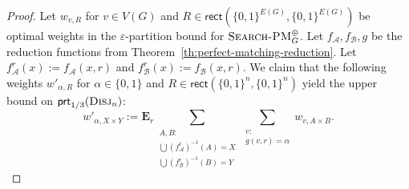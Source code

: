 \documentclass[11pt]{article}
\newcommand{\scterm}[1]{{\textrm{\sc #1}}}
\newcommand{\rect}{\mathsf{rect}}
\newcommand{\rectone}[1]{\rect(#1,#1)}
\newcommand{\prt}{\mathsf{prt}}
\newcommand{\disj}{\scterm{Disj}}
\newcommand{\xorPM}{\textsc{Search-PM}^\oplus}
\newcommand{\Alice}{\mathcal{A}}
\newcommand{\Bob}{\mathcal{B}}
\newcommand{\E}{\mathbf{E}}
\numberwithin{equation}{section}
\begin{document}
\begin{proof}
Let $w_{v,R}$ for $v \in V(G)$ and $R\in \rectone{\{0,1\}^{E(G)}}$ be optimal weights in the $\varepsilon$-partition bound for $\xorPM_G$. Let $f_{\Alice}, f_{\Bob}, g$ be the reduction functions from Theorem~\ref{th:perfect-matching-reduction}. Let $f_{\Alice}^r(x) := f_{\Alice}(x, r)$ and $f_{\Bob}^r(x) := f_{\Bob}(x,r)$. We claim that the following weights $w'_{\alpha, R}$ for $\alpha \in \{0,1\}$ and $R \in \rectone{\{0,1\}^n}$ yield the upper bound on $\prt_{1/3}(\disj_n)$:
\[ w'_{\alpha, X \times Y} := \E_r  \sum_{\substack{A, B\colon\\ \bigcup (f_{\Alice}^r)^{-1} (A) = X\\ \bigcup (f_{\Bob}^r)^{-1} (B) = Y}} \sum_{\substack{v\colon\\ g(v,r)=\alpha}} w_{v,A\times B}.\]


\end{proof}
\end{document}
